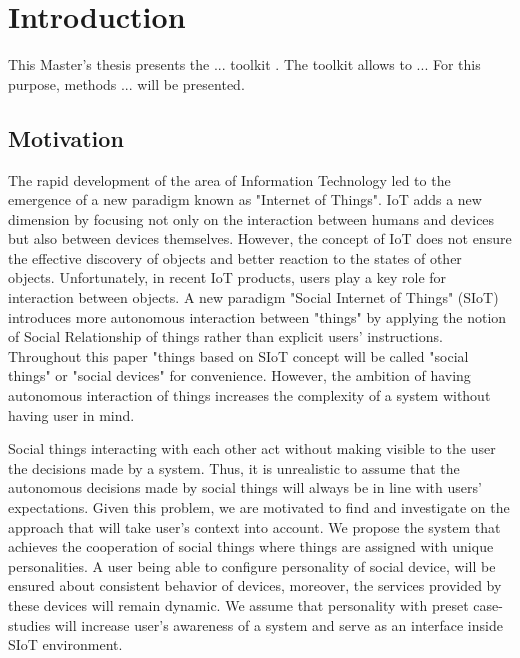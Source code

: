 \chapter{Introduction}
\label{ch:introduction}
This Master’s thesis presents the ... toolkit .
The toolkit allows to ...
For this purpose, methods ... will be presented.

\section{Motivation}
\label{sec:motivation}
The rapid development of the area of Information Technology led to the
emergence of a new paradigm known as "Internet of Things".
IoT adds a new dimension by focusing not only on the interaction between
humans and devices but also between devices themselves.
However, the concept of IoT does not ensure the effective discovery of
objects and better reaction to the states of other objects.
Unfortunately, in recent IoT products, users play a key role for interaction between objects.
A new paradigm "Social Internet of Things" (SIoT) introduces more autonomous interaction between "things"
by applying the notion of Social Relationship of things rather than explicit users' instructions.
Throughout this paper "things based on SIoT concept will be called "social things" or "social devices" for convenience.
However, the ambition of having autonomous interaction of things increases
the complexity of a system without having user in mind.

Social things interacting with each other act without making visible to the user the decisions made by a system.
Thus, it is unrealistic to assume that the autonomous decisions made by social things
will always be in line with users' expectations.
Given this problem, we are motivated to find and investigate on the approach that will take user's context into account.
We propose the system that achieves the cooperation of social things where
things are assigned with unique personalities.
A user being able to configure personality of social device, will be ensured about
consistent behavior of devices, moreover, the services provided by these devices will remain dynamic.
We assume that personality with preset case-studies will increase user's
awareness of a system and serve as an interface inside SIoT environment.

